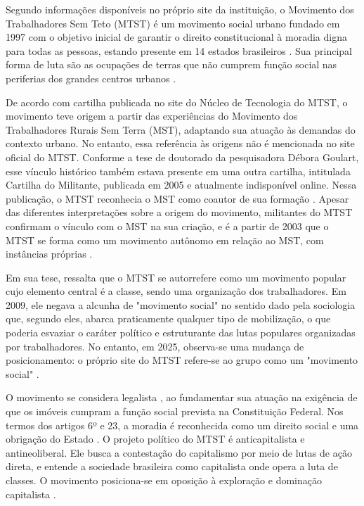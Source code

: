 Segundo informações disponíveis no próprio site da instituição, o Movimento dos Trabalhadores Sem Teto (MTST) é um movimento social urbano fundado em 1997 com o objetivo inicial de garantir o direito constitucional à moradia digna para todas as pessoas, estando presente em 14 estados brasileiros \cite{mtst_2024}. Sua principal forma de luta são as ocupações de terras que não cumprem função social nas periferias dos grandes centros urbanos \cite{mtst2023cartilha}.

De acordo com cartilha publicada no site do Núcleo de Tecnologia do MTST, o movimento teve origem a partir das experiências do Movimento dos Trabalhadores Rurais Sem Terra (MST), adaptando sua atuação às demandas do contexto urbano. No entanto, essa referência às origens não é mencionada no site oficial do MTST. Conforme a tese de doutorado da pesquisadora Débora Goulart, esse vínculo histórico também estava presente em uma outra cartilha, intitulada Cartilha do Militante, publicada em 2005 e atualmente indisponível online. Nessa publicação, o MTST reconhecia o MST como coautor de sua formação \cite{goulart2011anticapitalismo}. Apesar das diferentes interpretações sobre a origem do movimento, militantes do MTST confirmam o vínculo com o MST na sua criação, e é a partir de 2003 que o MTST se forma como um movimento autônomo em relação ao MST, com instâncias próprias  \cite{goulart2011anticapitalismo}.

Em sua tese, \citeauthor{goulart2011anticapitalismo} ressalta que o MTST se autorrefere como um movimento popular cujo elemento central é a classe, sendo uma organização dos trabalhadores. Em 2009, ele negava a alcunha de "movimento social" no sentido dado pela sociologia que, segundo eles, abarca praticamente qualquer tipo de mobilização, o que poderia esvaziar o caráter político e estruturante das lutas populares organizadas por trabalhadores. No entanto, em 2025, observa-se uma mudança de posicionamento: o próprio site do MTST refere-se ao grupo como um "movimento social" \cite{mtst_2024}. 

O movimento se considera legalista \cite{mtst2023cartilha}, ao fundamentar sua atuação na exigência de que os imóveis cumpram a função social prevista na Constituição Federal. Nos termos dos artigos 6º e 23, a moradia é reconhecida como um direito social e uma obrigação do Estado \cite{constituicao1988}. O projeto político do MTST é anticapitalista e antineoliberal. Ele busca a contestação do capitalismo por meio de lutas de ação direta, e entende a sociedade brasileira como capitalista onde opera a luta de classes. O movimento posiciona-se em oposição à exploração e dominação capitalista \cite{goulart2011anticapitalismo}.

